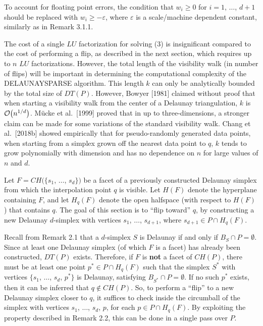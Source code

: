 \enspace
To account for floating point errors, the condition that $w_i \geq 0$
for $i=1$, $\ldots$, $d+1$ should be replaced with $w_i \geq -\varepsilon$,
where $\varepsilon$ is a scale/machine dependent constant, similarly as in
Remark 3.1.1.
\medskip

The cost of a single $LU$ factorization for solving (3) is insignificant
compared to the cost of performing a flip, as described in the next
section, which requires up to $n$ $LU$ factorizations. However, the total
length of the visibility walk (in number of flips) will be important in
determining the computational complexity of the DELAUNAYSPARSE algorithm.
This length $k$ can only be analytically bounded by the total size of
$DT(P)$. However, Bowyer [1981] claimed without proof that when
starting a visibility walk from the center of a Delaunay triangulation,
$k$ is ${\cal O}\big(n^{1/d}\big)$.
M{\"u}cke et al.\ [1999] proved that in up to three-dimensions, a stronger
claim can be made for some variations of the standard visibility walk.
Chang et al.\ [2018b] showed empirically that for pseudo-randomly
generated data points, when starting from a simplex grown off the nearest
data point to $q$, $k$ tends to grow polynomially with dimension and has
no dependence on $n$ for large values of $n$ and $d$.


Let $F = CH(\{s_1$, $\ldots$, $s_d\})$ be a facet of a previously
constructed Delaunay simplex from which the interpolation point $q$
is visible. Let $H(F)$ denote the hyperplane containing $F$, and let
$H_q(F)$ denote the open halfspace (with respect to $H(F)$) that
contains $q$. The goal of this section is to ``flip toward'' $q$, by
constructing a new Delaunay $d$-simplex with vertices
$s_1$, $\ldots$, $s_{d+1}$, where $s_{d+1} \in P \cap H_q(F)$.

Recall from Remark 2.1 that a $d$-simplex $S$ is Delaunay if and only
if $B_S \cap P = \emptyset$. Since at least one Delaunay simplex
(of which $F$ is a facet) has already been constructed, $DT(P)$ exists.
Therefore, if $F$ is {\bf not} a facet of $CH(P)$, there must
be at least one point $p^*\in P \cap H_q(F)$ such that the simplex
$S^*$ with vertices $\{s_1$, $\ldots$, $s_d$, $p^*\}$ is Delaunay,
satisfying $B_{S^*} \cap P = \emptyset$. If no such $p^*$ exists,
then it can be inferred that $q \not\in CH(P)$.
So, to perform a ``flip'' to a new Delaunay simplex
closer to $q$, it suffices to check inside the circumball of the
simplex with vertices $s_1$, $\ldots$, $s_d$, $p$, for each
$p \in P \cap H_q(F)$. By exploiting the property described in
Remark 2.2, this can be done in a single pass over $P$.

